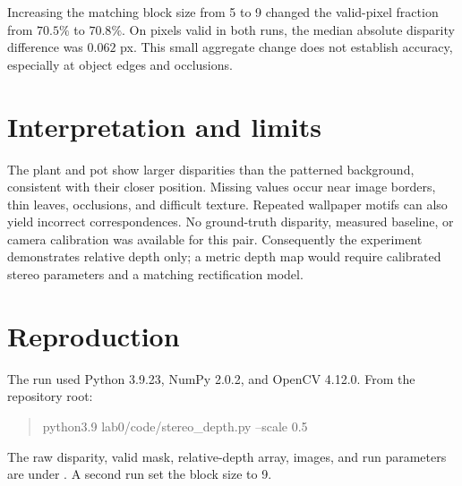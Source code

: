 \documentclass[justified]{tufte-handout}
\begin{document}
Increasing the matching block size from 5 to 9 changed the valid-pixel
fraction from \(70.5\%\) to \(70.8\%\). On pixels valid in both runs,
the median absolute disparity difference was \(0.062\) px.
This small aggregate change does not establish accuracy, especially
at object edges and occlusions.

\section{Interpretation and limits}

The plant and pot show larger disparities than the patterned background,
consistent with their closer position. Missing values occur near image
borders, thin leaves, occlusions, and difficult texture. Repeated
wallpaper motifs can also yield incorrect correspondences. No
ground-truth disparity, measured baseline, or camera calibration was
available for this pair. Consequently the experiment demonstrates
relative depth only; a metric depth map would require calibrated stereo
parameters and a matching rectification model.

\section{Reproduction}

The run used Python 3.9.23, NumPy 2.0.2, and OpenCV 4.12.0.
From the repository root:
\begin{quote}\small\ttfamily
python3.9 lab0/code/stereo\_depth.py --scale 0.5
\end{quote}
The raw disparity, valid mask, relative-depth array, images, and run
parameters are under . A second run set the
block size to 9.

\enlargethispage{5\baselineskip}


\end{document}

